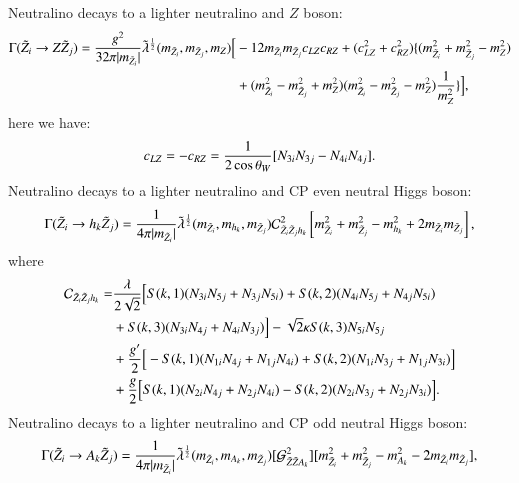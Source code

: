 \documentclass[final,3p,times,pdflatex]{elsarticle}
\begin{document}
Neutralino decays to a lighter neutralino and $Z$ boson:
\begin{equation} \label{neutZneutNMSSM}
\begin{aligned}
\Gamma(\tilde{Z}_i \rightarrow Z \tilde{Z}_j) = {g^2 \over 32 \pi |m_{\tilde{Z}_i}|} \tilde{\lambda}^{1 \over 2}(m_{\tilde{Z}_i},m_{\tilde{Z}_j},m_{Z})\Big[ & -12m_{\tilde{Z}_i} m_{\tilde{Z}_j} c_{LZ}c_{RZ} + (c_{LZ}^2 + c_{RZ}^2)\{(m_{\tilde{Z}_i}^2 + m_{\tilde{Z}_j}^2 - m_{Z}^2) \\ & + (m_{\tilde{Z}_i}^2 - m_{\tilde{Z}_j}^2 + m_{Z}^2)(m_{\tilde{Z}_i}^2 - m_{\tilde{Z}_j}^2 - m_{Z}^2){1 \over m_{Z}^2}\}\Big],
\end{aligned}
\end{equation}
here we have:
\begin{equation}
c_{LZ} = -c_{RZ} = {1 \over 2 \cos\theta_W} [N_{3i}N_{3j} - N_{4i}N_{4j}].
\end{equation}
Neutralino decays to a lighter neutralino and CP even neutral Higgs boson:
\begin{equation} \label{neuthneutNMSSM}
\Gamma(\tilde{Z}_i \rightarrow h_{k} \tilde{Z}_j) = {1 \over 4 \pi |m_{\tilde{Z}_i}|} \tilde{\lambda}^{1 \over 2}(m_{\tilde{Z}_i},m_{h_k}, m_{\tilde{Z}_j}) \mathcal{C}_{\tilde{Z}_i \tilde{Z}_j h_{k}}^2\left[m_{\tilde{Z}_i}^2 + m_{\tilde{Z}_j}^2 - m_{h_k}^2 + 2m_{\tilde{Z}_i}m_{\tilde{Z}_j}\right],
\end{equation}
where
\begin{equation} \label{neutneuthNMSSM}
\begin{aligned}
\mathcal{C}_{\tilde{Z}_i \tilde{Z}_j h_{k}} = & {\lambda \over 2 \sqrt{2}}\Big[S(k,1)(N_{3i}N_{5j} + N_{3j}N_{5i}) + S(k,2)(N_{4i}N_{5j} + N_{4j}N_{5i}) \\ &  + S(k,3)(N_{3i}N_{4j} + N_{4i}N_{3j})\Big] - \sqrt{2} \kappa S(k,3) N_{5i}N_{5j} \\ &  + {g' \over 2}\Big[-S(k,1)(N_{1i}N_{4j} + N_{1j}N_{4i}) + S(k,2)(N_{1i}N_{3j} + N_{1j}N_{3i})\Big] \\ &  + {g \over 2}\Big[S(k,1)(N_{2i}N_{4j} + N_{2j}N_{4i}) - S(k,2)(N_{2i}N_{3j} + N_{2j}N_{3i})\Big].
\end{aligned}
\end{equation}
Neutralino decays to a lighter neutralino and CP odd neutral Higgs boson:
\begin{equation} \label{neutAneutNMSSM}
\Gamma(\tilde{Z}_i \rightarrow A_{k} \tilde{Z}_j) = {1 \over 4 \pi |m_{\tilde{Z}_i}|} \tilde{\lambda}^{1 \over 2}(m_{\tilde{Z}_i},m_{A_k}, m_{\tilde{Z}_j})[\mathcal{G}_{\tilde{Z} \tilde{Z} A_k}^2][m_{\tilde{Z}_i}^2 + m_{\tilde{Z}_j}^2 - m_{A_k}^2 - 2m_{\tilde{Z}_i}m_{\tilde{Z}_j}],
\end{equation}
\end{document}
